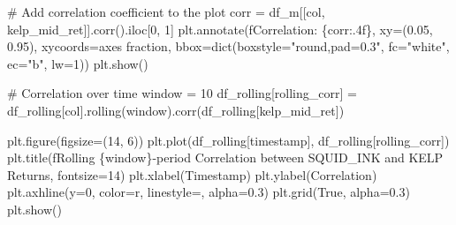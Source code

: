 \documentclass[
  letterpaper,
  DIV=11,
  numbers=noendperiod]{scrartcl}
\newenvironment{Shaded}{\begin{snugshade}}{\end{snugshade}}
\newcommand{\BuiltInTok}[1]{\textcolor[rgb]{0.00,0.23,0.31}{#1}}
\newcommand{\CommentTok}[1]{\textcolor[rgb]{0.37,0.37,0.37}{#1}}
\newcommand{\DecValTok}[1]{\textcolor[rgb]{0.68,0.00,0.00}{#1}}
\newcommand{\FloatTok}[1]{\textcolor[rgb]{0.68,0.00,0.00}{#1}}
\newcommand{\NormalTok}[1]{\textcolor[rgb]{0.00,0.23,0.31}{#1}}
\newcommand{\OperatorTok}[1]{\textcolor[rgb]{0.37,0.37,0.37}{#1}}
\newcommand{\SpecialCharTok}[1]{\textcolor[rgb]{0.37,0.37,0.37}{#1}}
\newcommand{\SpecialStringTok}[1]{\textcolor[rgb]{0.13,0.47,0.30}{#1}}
\newcommand{\StringTok}[1]{\textcolor[rgb]{0.13,0.47,0.30}{#1}}
\newcommand{\VariableTok}[1]{\textcolor[rgb]{0.07,0.07,0.07}{#1}}
\begin{document}
\begin{Shaded}
\begin{Highlighting}[]
    \CommentTok{\# Add correlation coefficient to the plot}
\NormalTok{    corr }\OperatorTok{=}\NormalTok{ df\_m[[col, }\StringTok{\textquotesingle{}kelp\_mid\_ret\textquotesingle{}}\NormalTok{]].corr().iloc[}\DecValTok{0}\NormalTok{, }\DecValTok{1}\NormalTok{]}
\NormalTok{    plt.annotate(}\SpecialStringTok{f\textquotesingle{}Correlation: }\SpecialCharTok{\{}\NormalTok{corr}\SpecialCharTok{:.4f\}}\SpecialStringTok{\textquotesingle{}}\NormalTok{, }
\NormalTok{                xy}\OperatorTok{=}\NormalTok{(}\FloatTok{0.05}\NormalTok{, }\FloatTok{0.95}\NormalTok{), xycoords}\OperatorTok{=}\StringTok{\textquotesingle{}axes fraction\textquotesingle{}}\NormalTok{, }
\NormalTok{                bbox}\OperatorTok{=}\BuiltInTok{dict}\NormalTok{(boxstyle}\OperatorTok{=}\StringTok{"round,pad=0.3"}\NormalTok{, fc}\OperatorTok{=}\StringTok{"white"}\NormalTok{, ec}\OperatorTok{=}\StringTok{"b"}\NormalTok{, lw}\OperatorTok{=}\DecValTok{1}\NormalTok{))}
\NormalTok{    plt.show()}

    \CommentTok{\# Correlation over time}
\NormalTok{    window }\OperatorTok{=} \DecValTok{10}
\NormalTok{    df\_rolling[}\StringTok{\textquotesingle{}rolling\_corr\textquotesingle{}}\NormalTok{] }\OperatorTok{=}\NormalTok{ df\_rolling[col].rolling(window).corr(df\_rolling[}\StringTok{\textquotesingle{}kelp\_mid\_ret\textquotesingle{}}\NormalTok{])}

\NormalTok{    plt.figure(figsize}\OperatorTok{=}\NormalTok{(}\DecValTok{14}\NormalTok{, }\DecValTok{6}\NormalTok{))}
\NormalTok{    plt.plot(df\_rolling[}\StringTok{\textquotesingle{}timestamp\textquotesingle{}}\NormalTok{], df\_rolling[}\StringTok{\textquotesingle{}rolling\_corr\textquotesingle{}}\NormalTok{])}
\NormalTok{    plt.title(}\SpecialStringTok{f\textquotesingle{}Rolling }\SpecialCharTok{\{}\NormalTok{window}\SpecialCharTok{\}}\SpecialStringTok{{-}period Correlation between SQUID\_INK and KELP Returns\textquotesingle{}}\NormalTok{, fontsize}\OperatorTok{=}\DecValTok{14}\NormalTok{)}
\NormalTok{    plt.xlabel(}\StringTok{\textquotesingle{}Timestamp\textquotesingle{}}\NormalTok{)}
\NormalTok{    plt.ylabel(}\StringTok{\textquotesingle{}Correlation\textquotesingle{}}\NormalTok{)}
\NormalTok{    plt.axhline(y}\OperatorTok{=}\DecValTok{0}\NormalTok{, color}\OperatorTok{=}\StringTok{\textquotesingle{}r\textquotesingle{}}\NormalTok{, linestyle}\OperatorTok{=}\StringTok{\textquotesingle{}{-}{-}\textquotesingle{}}\NormalTok{, alpha}\OperatorTok{=}\FloatTok{0.3}\NormalTok{)}
\NormalTok{    plt.grid(}\VariableTok{True}\NormalTok{, alpha}\OperatorTok{=}\FloatTok{0.3}\NormalTok{)}
\NormalTok{    plt.show()}


\end{Highlighting}
\end{Shaded}
\end{document}
